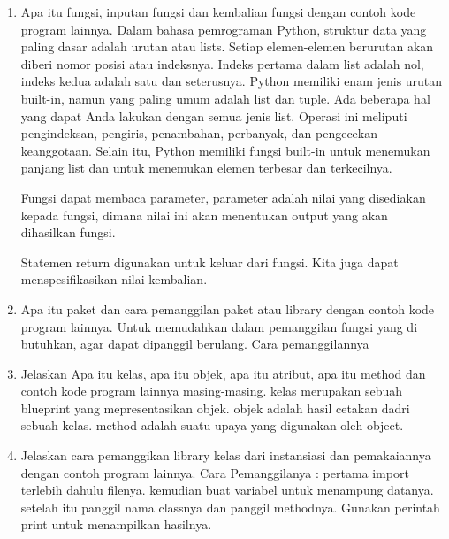 \begin{enumerate}
\item Apa itu fungsi, inputan fungsi dan kembalian fungsi dengan contoh kode program
    lainnya.
    \subitem Dalam bahasa pemrograman Python, struktur data yang paling dasar adalah urutan atau lists. Setiap elemen-elemen berurutan akan diberi nomor posisi atau indeksnya. Indeks pertama dalam list adalah nol, indeks kedua adalah satu dan seterusnya.
Python memiliki enam jenis urutan built-in, namun yang paling umum adalah list dan tuple. Ada beberapa hal yang dapat Anda lakukan dengan semua jenis list. Operasi ini meliputi pengindeksan, pengiris, penambahan, perbanyak, dan pengecekan keanggotaan. Selain itu, Python memiliki fungsi built-in untuk menemukan panjang list dan untuk menemukan elemen terbesar dan terkecilnya.
        

    \subitem Fungsi dapat membaca parameter, parameter adalah nilai yang disediakan kepada fungsi, dimana nilai ini akan menentukan output yang akan dihasilkan fungsi.
        

     \subitem Statemen return digunakan untuk keluar dari fungsi. Kita juga dapat menspesifikasikan nilai kembalian.
        

\item Apa itu paket dan cara pemanggilan paket atau library dengan contoh kode
    program lainnya.
    \subitem Untuk memudahkan dalam pemanggilan fungsi yang di butuhkan, agar dapat dipanggil berulang.
    Cara pemanggilannya
    

\item Jelaskan Apa itu kelas, apa itu objek, apa itu atribut, apa itu method dan contoh kode program lainnya masing-masing.
    kelas merupakan sebuah blueprint yang mepresentasikan objek.
    objek adalah hasil cetakan dadri sebuah kelas.
    method adalah suatu upaya yang digunakan oleh object.
    

\item Jelaskan cara pemanggikan library kelas dari instansiasi dan pemakaiannya dengan contoh program lainnya.
    Cara Pemanggilanya :
    \subitem pertama import terlebih dahulu filenya.
    \subitem kemudian buat variabel untuk menampung datanya.
    \subitem setelah itu panggil nama classnya dan panggil methodnya.
    \subitem Gunakan perintah print untuk menampilkan hasilnya.
      


\end{enumerate}
